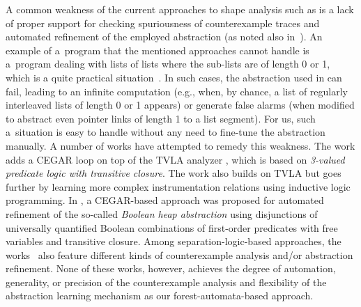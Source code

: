 {A common weakness of the
current approaches to shape analysis such as \cite{InvaderCAV07,InvaderCAV08,indPrSynt07,locle:secondorder,predator11,slayer11,juggrnaut10,juggrnaut-learning12} is a lack of proper support for checking
spuriousness of counterexample traces and automated refinement
of the employed abstraction (as noted also in~\cite{splinter15}).
%
An example of a~program that the mentioned approaches cannot handle is a~program
dealing with lists of lists where the sub-lists are of
length 0 or 1, which is a quite practical situation~\cite{InvaderTR07}. In such
cases, the abstraction used in \cite{InvaderCAV07,InvaderCAV08} can fail,
leading to an infinite computation (e.g., when, by chance, a list of regularly
interleaved lists of length 0 or 1 appears) or generate false alarms (when
modified to abstract even pointer links of length 1 to a list segment). For us,
such a~situation is easy to handle without any need to fine-tune the abstraction
manually. 
%
%
%
%
A number of works have attempted to remedy this weakness.
The work \cite{beyer:lazy_shape_analysis} adds a CEGAR loop on top of the TVLA
analyzer \cite{pale}, which is based on \emph{3-valued predicate logic with
transitive closure}. 
%
The work
\cite{Loginov:AbstrRefViaInductLearning:05} also builds on TVLA but goes
further by learning more complex instrumentation relations using
inductive logic programming.
%
In \cite{podelski:popl10}, a CEGAR-based approach was proposed for automated
refinement of the so-called \emph{Boolean heap abstraction} using disjunctions
of universally quantified Boolean combinations of first-order predicates with
free variables and transitive closure.
%
Among separation-logic-based approaches, the works~\cite{slayer12,splinter15,botincan15} 
also feature different kinds of counterexample analysis and/or abstraction refinement.
%
None of these works, however, achieves the degree of automation, generality, or
precision of the counterexample analysis and flexibility of the abstraction
learning mechanism as our forest-automata-based approach.
%



}
